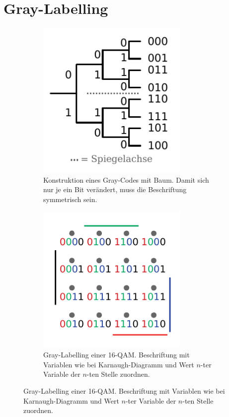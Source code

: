 \documentclass[a4paper, 11pt]{article}
\begin{document}
\section*{Gray-Labelling}
\begin{figure}[H]
	\centering
	\begin{subfigure}{.45\textwidth}
		\includegraphics[width=0.8\textwidth]{img/gray_tree.pdf}
		\caption*{Konstruktion eines Gray-Codes mit Baum. Damit sich nur je ein Bit verändert, muss die Beschriftung symmetrisch sein.}
	\end{subfigure}
	\hspace{.07\textwidth}
	\begin{subfigure}{.45\textwidth}
		\includegraphics[width=0.8\textwidth]{img/gray_16qam.pdf}
		\caption*{Gray-Labelling einer 16-QAM. Beschriftung mit Variablen wie bei Karnaugh-Diagramm und Wert $n$-ter Variable der $n$-ten Stelle zuordnen.}
	\end{subfigure}
\end{figure}
\end{document}
